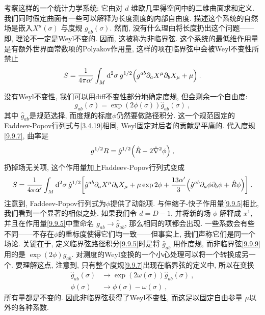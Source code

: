 考察这样的一个统计力学系统: 它由对 $d$ 维欧几里得空间中的二维曲面求和定义. 我们同时假定曲面有一些可以解释为长度测度的内部自由度. 
描述这个系统的自然场是嵌入$X^{\mu}(\sigma)$ 与度规 $g_{a b}(\sigma)$. 然而, 没有什么理由将长度扔出这个问题——即, 理论不一定是Weyl不变的. 
因而, 这被称为非临界弦. 这个系统的最低维作用量是有额外世界面常数项的Polyakov作用量, 这样的项在临界弦中会被Weyl不变性所禁止
\begin{equation}
	S=\frac{1}{4 \pi \alpha^{\prime}} \int_{M} \mathrm{d}^{2} \sigma \: g^{1/2} 
	\Bigl(g^{ab} \partial_{a} X^{\mu} \partial_{b} X_{\mu}+\mu\Bigr) \:. \label{9.9.6}
\end{equation}

没有Weyl不变性, 我们可以用diff不变性部分地确定度规, 但会剩余一个自由度:
\begin{equation}
	g_{ab}(\sigma)=\exp (2 \phi(\sigma)) \hat{g}_{ab}(\sigma) \:, \label{9.9.7}
\end{equation}
其中 $\hat{g}_{ab}$是规范选择, 而度规的标度$\phi$仍然要做路径积分. 这一个规范固定的 Faddeev-Popov行列式与\eqref{3.4.19}相同, 
Weyl固定对后者的贡献是平庸的. 代入度规\eqref{9.9.7}, 曲率是
\begin{equation}
	g^{1/2} R = \hat{g}^{1/2}\Bigl(\hat{R}-2 \hat{\nabla}^{2} \phi\Bigr) \:, \label{9.9.8}
\end{equation}
扔掉场无关项, 这个作用量加上Faddeev-Popov行列式变成
\begin{equation}
	S=\frac{1}{4 \pi \alpha^{\prime}} \int_{M} \mathrm{d}^{2} \sigma \: \hat{g}^{1/2} \biggl[\hat{g}^{ab} \partial_{a} X^{\mu} \partial_{b} X_{\mu}+\mu \exp 2 \phi + \frac{13 \alpha^{\prime}}{3}\Bigl(\hat{g}^{ab} \partial_{a} \phi \partial_{b} \phi+\hat{R} \phi\Bigr)\biggr]\:.
	\label{9.9.9}
\end{equation}
注意到,  Faddeev-Popov行列式为$\phi$提供了动能项. 与伸缩子-快子作用量\eqref{9.9.5}相比, 我们看到一个显著的相似之处. 
如果我们令 $d=D-1$, 并将新的场 $\phi$ 解释成 $x^{1}$, 并且在作用量\eqref{9.9.5}中重命名 $g_{a b} \to \hat{g}_{a b}$, 那么相同的项都会出现. 
一些系数会有些不同——不存在$\phi$的重标度使得它们均一致——但事实上, 我们声称它们是同一个场论. 
关键在于, 定义临界弦路径积分\eqref{9.9.5}时是将 $\hat{g}_{ab}$ 用作度规, 而非临界弦\eqref{9.9.9}用的是 $\exp (2 \phi) \hat{g}_{a b} $. 
对测度的Weyl变换的一个小心处理可以将一个转换成另一个. 要理解这点, 注意到, 只有整个度规\eqref{9.9.7}出现在临界弦的定义中, 所以在变换
\begin{subequations} \label{9.9.10}
\begin{align}
		\hat{g}_{a b}(\sigma)  &\rightarrow \exp (2 \omega(\sigma)) \hat{g}_{a b}(\sigma) \:,  \label{9.9.10a}\\
		\phi(\sigma) &\rightarrow \phi(\sigma)-\omega(\sigma) \:, \label{9.9.10b}
\end{align}
\end{subequations}
所有量都是不变的. 因此非临界弦获得了Weyl不变性, 而这足以固定自由参量 $\mu$以外的各种系数.

